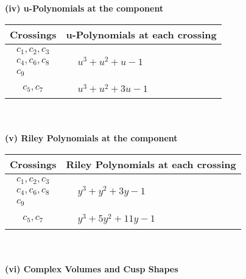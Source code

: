 \documentclass[1p]{elsarticle_modified}
\theoremstyle{definition}
\begin{document}
\newpage\renewcommand{\arraystretch}{1}
\flushleft \textbf{(iv) u-Polynomials at the component}\newline \\
\begin{tabular}{m{50pt}|m{274pt}}
Crossings & \hspace{64pt}u-Polynomials at each crossing \\
\hline $$\begin{aligned}c_{1},c_{2},c_{3}\\c_{4},c_{6},c_{8}\\c_{9}\end{aligned}$$&$\begin{aligned}
&u^3+u^2+u-1
\end{aligned}$\\
\hline $$\begin{aligned}c_{5},c_{7}\end{aligned}$$&$\begin{aligned}
&u^3+u^2+3 u-1
\end{aligned}$\\
\hline
\end{tabular}\\~\\
\newpage\renewcommand{\arraystretch}{1}
\flushleft \textbf{(v) Riley Polynomials at the component}\newline \\
\begin{tabular}{m{50pt}|m{274pt}}
Crossings & \hspace{64pt}Riley Polynomials at each crossing \\
\hline $$\begin{aligned}c_{1},c_{2},c_{3}\\c_{4},c_{6},c_{8}\\c_{9}\end{aligned}$$&$\begin{aligned}
&y^3+y^2+3 y-1
\end{aligned}$\\
\hline $$\begin{aligned}c_{5},c_{7}\end{aligned}$$&$\begin{aligned}
&y^3+5 y^2+11 y-1
\end{aligned}$\\
\hline
\end{tabular}\\~\\
\newpage\flushleft \textbf{(vi) Complex Volumes and Cusp Shapes}
\end{document}
